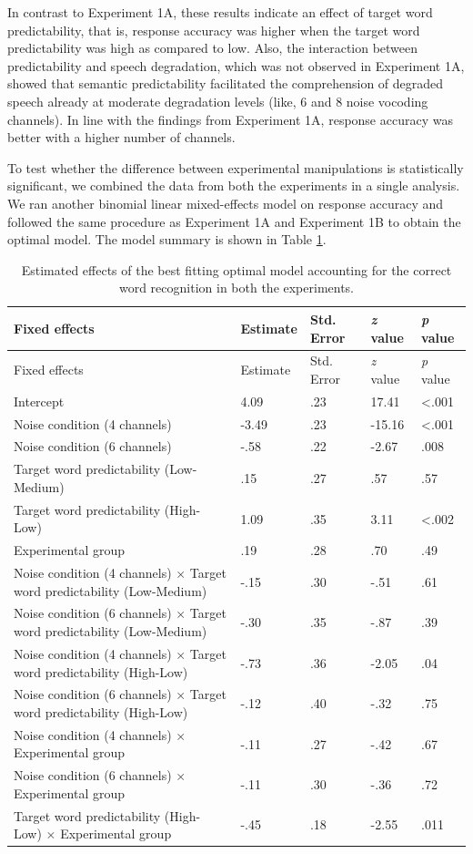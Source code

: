 \documentclass[a4paper, nobind]{templates/ociamthesis}
\begin{document}
In contrast to Experiment 1A, these results indicate an effect of target word predictability, that is, response accuracy was higher when the target word predictability was high as compared to low.
Also, the interaction between predictability and speech degradation, which was not observed in Experiment 1A, showed that semantic predictability facilitated the comprehension of degraded speech already at moderate degradation levels (like, 6 and 8 noise vocoding channels).
In line with the findings from Experiment 1A, response accuracy was better with a higher number of channels.

To test whether the difference between experimental manipulations is statistically significant, we combined the data from both the experiments in a single analysis.
We ran another binomial linear mixed-effects model on response accuracy and followed the same procedure as Experiment 1A and Experiment 1B to obtain the optimal model.
The model summary is shown in Table \ref{results1ab}.

\begin{longtable}[]{@{}lllll@{}}
\caption{Estimated effects of the best fitting optimal model accounting for the correct word recognition in both the experiments.}
\label{results1ab}
\tabularnewline
\toprule
Fixed effects & Estimate & Std. Error & \emph{z} value & \emph{p}
value \\
\midrule
\endfirsthead
\toprule
Fixed effects & Estimate & Std. Error & \emph{z} value & \emph{p}
value \\
\midrule
\endhead
Intercept & 4.09 & .23 & 17.41 & \textless.001 \\
Noise condition (4 channels) & -3.49 & .23 & -15.16 & \textless.001 \\
Noise condition (6 channels) & -.58 & .22 & -2.67 & .008 \\
Target word predictability (Low-Medium) & .15 & .27 & .57 & .57 \\
Target word predictability (High-Low) & 1.09 & .35 & 3.11 &
\textless.002 \\
Experimental group & .19 & .28 & .70 & .49 \\
Noise condition (4 channels) $\times$ Target word predictability (Low-Medium) & -.15 & .30 & -.51 &
.61 \\
Noise condition (6 channels) $\times$ Target word predictability (Low-Medium) & -.30 & .35 & -.87 &
.39 \\
Noise condition (4 channels) $\times$ Target word predictability (High-Low) & -.73 & .36 & -2.05 &
.04 \\
Noise condition (6 channels) $\times$ Target word predictability (High-Low) & -.12 & .40 & -.32 &
.75 \\
Noise condition (4 channels) $\times$ Experimental group & -.11 & .27 & -.42 &
.67 \\
Noise condition (6 channels) $\times$ Experimental group & -.11 & .30 & -.36 &
.72 \\
Target word predictability (High-Low) $\times$ Experimental group & -.45 & .18 & -2.55 &
.011 \\
\bottomrule
\end{longtable}
\end{document}
